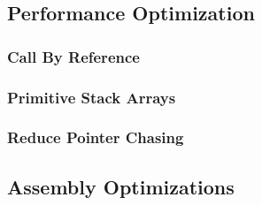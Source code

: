 \subsection{Performance Optimization}
\subsubsection{Call By Reference}
\subsubsection{Primitive Stack Arrays}
\subsubsection{Reduce Pointer Chasing}
\subsection{Assembly Optimizations}
